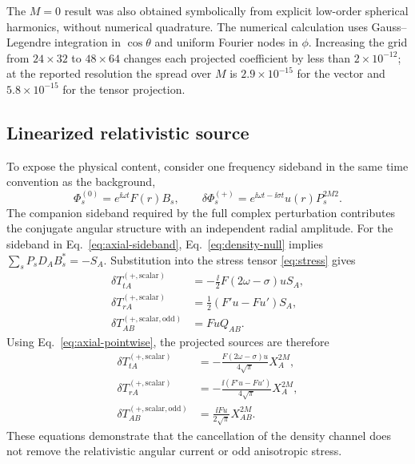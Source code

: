 The $M=0$ result was also obtained symbolically from explicit low-order
spherical harmonics, without numerical quadrature. The numerical calculation
uses Gauss--Legendre integration in $\cos\theta$ and uniform Fourier nodes in
$\phi$. Increasing the grid from $24\times32$ to $48\times64$ changes each
projected coefficient by less than $2\times10^{-12}$; at the reported
resolution the spread over $M$ is $2.9\times10^{-15}$ for the vector and
$5.8\times10^{-15}$ for the tensor projection.

\subsection{Linearized relativistic source}

To expose the physical content, consider one frequency sideband in the same
time convention as the background,
\begin{equation}
\Phi_s^{(0)}=e^{\ii\omega t}F(r)B_s,
\qquad
\delta\Phi_s^{(+)}=e^{\ii\omega t-\ii\sigma t}u(r)P_s^{2M2}.
\label{eq:axial-sideband}
\end{equation}
The companion sideband required by the full complex perturbation contributes
the conjugate angular structure with an independent radial amplitude. For the
sideband in Eq.~\eqref{eq:axial-sideband}, Eq.~\eqref{eq:density-null} implies
$\sum_sP_sD_AB_s^*=-S_A$. Substitution into the stress tensor
\eqref{eq:stress} gives
\begin{align}
\delta T_{tA}^{(+,\mathrm{scalar})}
&=-\frac{\ii}{2}F(2\omega-\sigma)uS_A,
\label{eq:stress-ta-pre}\\
\delta T_{rA}^{(+,\mathrm{scalar})}
&=\frac{1}{2}(F'u-Fu')S_A,
\label{eq:stress-ra-pre}\\
\delta T_{AB}^{(+,\mathrm{scalar,odd})}
&=FuQ_{AB}.
\label{eq:stress-ab-pre}
\end{align}
Using Eq.~\eqref{eq:axial-pointwise}, the projected sources are therefore
\begin{align}
\delta T_{tA}^{(+,\mathrm{scalar})}
&=-\frac{F(2\omega-\sigma)u}{4\sqrt\pi}X_A^{2M},
\label{eq:stress-ta}\\
\delta T_{rA}^{(+,\mathrm{scalar})}
&=-\frac{\ii(F'u-Fu')}{4\sqrt\pi}X_A^{2M},
\label{eq:stress-ra}\\
\delta T_{AB}^{(+,\mathrm{scalar,odd})}
&=\frac{\ii Fu}{2\sqrt\pi}X_{AB}^{2M}.
\label{eq:stress-ab}
\end{align}
These equations demonstrate that the cancellation of the density channel does
not remove the relativistic angular current or odd anisotropic stress.

